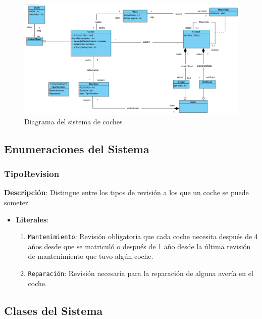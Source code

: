 \documentclass[12pt.a4paper]{article}
\begin{document}
\begin{figure}[H]
     \includegraphics[width=1\linewidth]{diagramas/VPP_A.png}
     \caption{Diagrama del sistema de coches}
     \label{Diagrama del sistema de coches}
\end{figure}
\vspace{1.0 cm}

\subsection{Enumeraciones del Sistema}

\subsubsection{TipoRevision}
\textbf{Descripción}:  
Distingue entre los tipos de revisión a los que un coche se puede someter.
\begin{itemize}
    \item \textbf{Literales}:
    \begin{enumerate}
        \item \texttt{Mantenimiento}: Revisión obligatoria que cada coche necesita después de 4 años desde que se matriculó o después de 1 año desde la última revisión de mantenimiento que tuvo algún coche.
        \item \texttt{Reparación}: Revisión necesaria para la reparación de alguna avería en el coche.
    \end{enumerate}
\end{itemize}

\subsection{Clases del Sistema}
\end{document}
